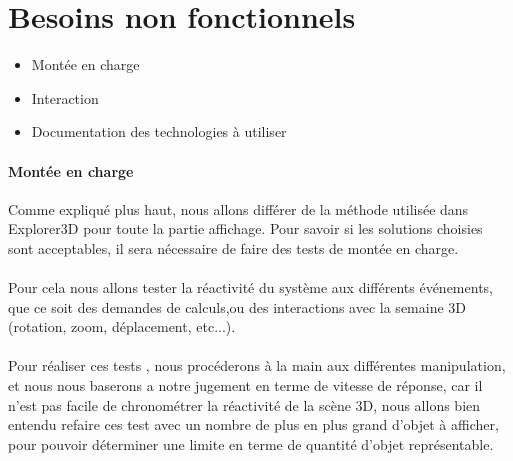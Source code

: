 \section{Besoins non fonctionnels}
\begin{itemize}
\item Montée en charge
\item Interaction
\item Documentation des technologies à utiliser
\end{itemize}
\paragraph{Montée en charge} Comme expliqué plus haut, nous allons différer de la méthode utilisée dans Explorer3D pour toute la partie affichage. Pour savoir si les solutions choisies sont acceptables, il sera nécessaire de faire des tests de montée en charge.\paragraph{} Pour cela nous allons tester la réactivité du système aux différents événements, que ce soit des demandes de calculs,ou des interactions avec la semaine 3D (rotation, zoom, déplacement, etc...).\paragraph{} Pour réaliser ces tests , nous procéderons à la main aux différentes manipulation, et nous nous baserons a notre jugement en terme de vitesse de réponse, car il n'est pas facile de chronométrer la réactivité de la scène 3D, nous allons bien entendu refaire ces test avec un nombre de plus en plus grand d'objet à afficher, pour pouvoir déterminer une limite en terme de quantité d'objet représentable.
\newpage